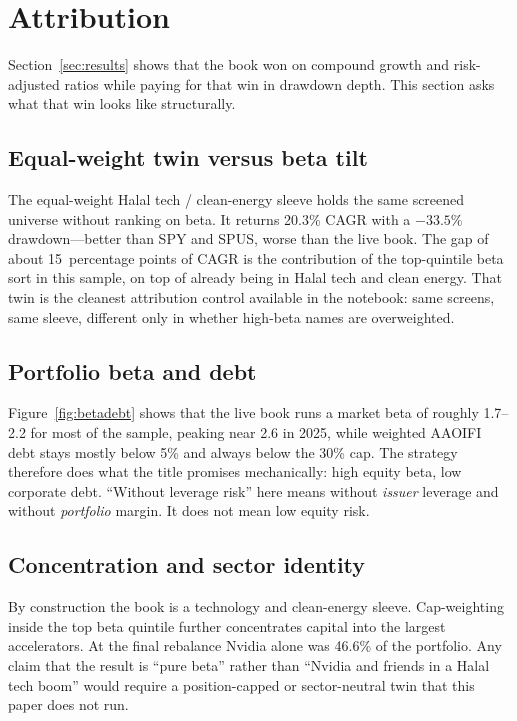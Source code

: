 \documentclass[11pt,letterpaper]{article}
\begin{document}
\section{Attribution}
\label{sec:attrib}

Section~\ref{sec:results} shows that the book won on compound growth and risk-adjusted ratios while paying for that win in drawdown depth. This section asks what that win looks like structurally.

\subsection{Equal-weight twin versus beta tilt}

The equal-weight Halal tech / clean-energy sleeve holds the same screened universe without ranking on beta. It returns 20.3\% CAGR with a $-33.5\%$ drawdown---better than SPY and SPUS, worse than the live book. The gap of about 15~percentage points of CAGR is the contribution of the top-quintile beta sort in this sample, on top of already being in Halal tech and clean energy. That twin is the cleanest attribution control available in the notebook: same screens, same sleeve, different only in whether high-beta names are overweighted.

\subsection{Portfolio beta and debt}

Figure~\ref{fig:betadebt} shows that the live book runs a market beta of roughly 1.7--2.2 for most of the sample, peaking near 2.6 in 2025, while weighted AAOIFI debt stays mostly below 5\% and always below the 30\% cap. The strategy therefore does what the title promises mechanically: high equity beta, low corporate debt. ``Without leverage risk'' here means without \emph{issuer} leverage and without \emph{portfolio} margin. It does not mean low equity risk.

\subsection{Concentration and sector identity}

By construction the book is a technology and clean-energy sleeve. Cap-weighting inside the top beta quintile further concentrates capital into the largest accelerators. At the final rebalance Nvidia alone was 46.6\% of the portfolio. Any claim that the result is ``pure beta'' rather than ``Nvidia and friends in a Halal tech boom'' would require a position-capped or sector-neutral twin that this paper does not run.
\end{document}
